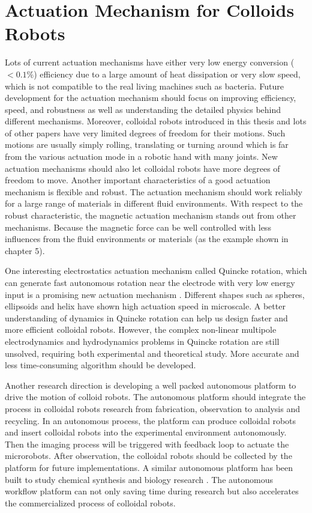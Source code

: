 \section{Actuation Mechanism for  Colloids Robots}
 Lots of current actuation mechanisms have either very low energy conversion ($<0.1\%$) efficiency due to a large amount of heat dissipation or very slow speed, which is not compatible to the real living machines such as bacteria. Future development for  the actuation mechanism should focus on improving efficiency, speed, and robustness as well as understanding the detailed physics behind different mechanisms. Moreover, colloidal robots introduced in this thesis and lots of other papers have very limited degrees of freedom for their motions. Such motions are usually simply rolling, translating or turning around which is far from the various actuation mode in a robotic hand with many joints. New actuation mechanisms should also let colloidal robots have more degrees of freedom to move.  Another important characteristics of a good actuation mechanism  is flexible and robust. The actuation mechanism should work reliably for a large range of materials in different fluid environments. With respect to the robust characteristic,  the magnetic actuation mechanism stands out from other mechanisms. Because the magnetic force can be well controlled with less influences from the fluid environments or materials (as the example shown in chapter 5).

One interesting electrostatics actuation mechanism called Quincke rotation, which can generate fast autonomous rotation near the electrode with very low energy input is a promising new actuation mechanism \autocite{das2013electrohydrodynamic}. Different shapes such as spheres, ellipsoids and helix have shown high actuation speed in microscale\autocite{brosseau2019relating,das2019active}. A better understanding of dynamics in Quincke rotation can help us design faster and more efficient colloidal robots. However, the complex non-linear multipole electrodynamics and hydrodynamics problems in Quincke rotation are still unsolved, requiring  both experimental and theoretical study. More accurate  and  less time-consuming algorithm should be developed\autocite{fiore2019fast}.

Another research direction is developing a well packed autonomous platform to drive the motion of colloid  robots.  The autonomous platform should integrate the process in colloidal robots research from fabrication, observation to analysis and recycling. In an autonomous process, the platform can produce colloidal robots and insert colloidal robots into the experimental environment autonomously. Then the imaging process will be triggered  with feedback loop to actuate the microrobots. After observation, the colloidal robots should be collected by the platform for future implementations. A similar autonomous platform has been built to study chemical synthesis and biology research \autocite{grizou2020curious,chao2019systems}. The autonomous workflow platform can not only saving time during research but also accelerates the commercialized process of colloidal robots.   

